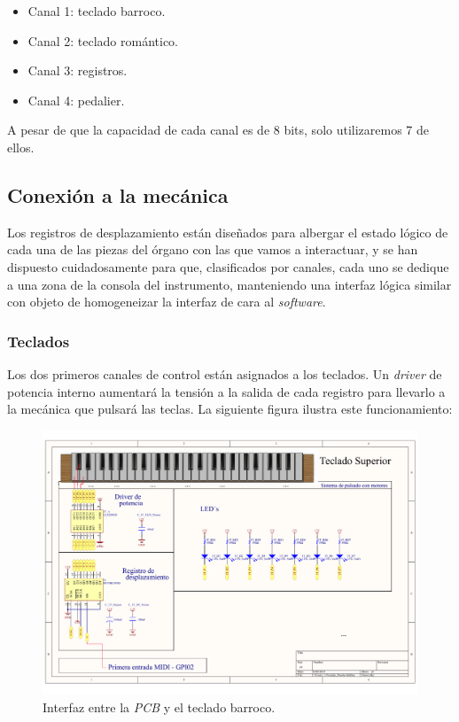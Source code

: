 \begin{itemize}
	\item Canal 1: teclado barroco.
	\item Canal 2: teclado romántico.
	\item Canal 3: registros.
	\item Canal 4: pedalier.
\end{itemize}

A pesar de que la capacidad de cada canal es de 8 bits, solo utilizaremos 7 de ellos.

\subsection{Conexión a la mecánica}

Los registros de desplazamiento están diseñados para albergar el estado lógico de cada una de las piezas del órgano con las que vamos a interactuar, y se han dispuesto cuidadosamente para que, clasificados por canales, cada uno se dedique a una zona de la consola del instrumento, manteniendo una interfaz lógica similar con objeto de homogeneizar la interfaz de cara al \textit{software}.

\subsubsection{Teclados}

Los dos primeros canales de control están asignados a los teclados. Un \textit{driver} de potencia interno aumentará la tensión a la salida de cada registro para llevarlo a la mecánica que pulsará las teclas. La siguiente figura ilustra este funcionamiento:

\smallskip

\begin{figure}[H]
	\noindent \begin{centering}
		\includegraphics[width=\linewidth*2/3]{capitulo3/pcb_teclado}
		\par\end{centering}
	\smallskip
	\caption{\label{fig:pcb_teclado} Interfaz entre la \textit{PCB} y el teclado barroco.}
\end{figure} 

